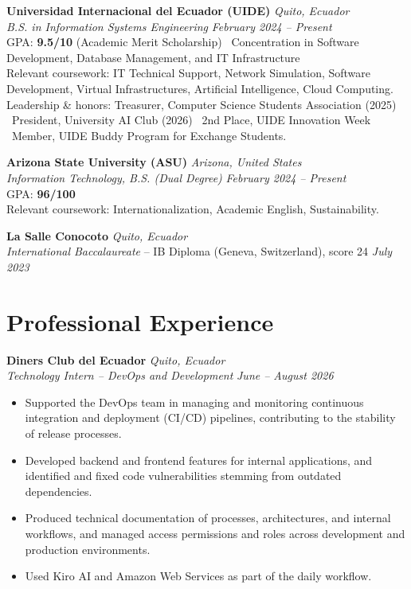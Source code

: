 \documentclass[10.5pt]{article}
\begin{document}
\textbf{Universidad Internacional del Ecuador (UIDE)} \hfill \textit{Quito, Ecuador}\\
\textit{B.S. in Information Systems Engineering} \hfill \textit{February 2024 -- Present}\\
GPA: \textbf{9.5/10} (Academic Merit Scholarship) \textbullet\ Concentration in Software Development, Database Management, and IT Infrastructure\\
Relevant coursework: IT Technical Support, Network Simulation, Software Development, Virtual Infrastructures, Artificial Intelligence, Cloud Computing.\\
Leadership \& honors: Treasurer, Computer Science Students Association (2025) \textbullet\ President, University AI Club (2026) \textbullet\ 2nd Place, UIDE Innovation Week \textbullet\ Member, UIDE Buddy Program for Exchange Students.

\vspace{0.3em}
\textbf{Arizona State University (ASU)} \hfill \textit{Arizona, United States}\\
\textit{Information Technology, B.S. (Dual Degree)} \hfill \textit{February 2024 -- Present}\\
GPA: \textbf{96/100}\\
Relevant coursework: Internationalization, Academic English, Sustainability.

\vspace{0.3em}
\textbf{La Salle Conocoto} \hfill \textit{Quito, Ecuador}\\
\textit{International Baccalaureate} -- IB Diploma (Geneva, Switzerland), score 24 \hfill \textit{July 2023}

\section*{Professional Experience}

\textbf{Diners Club del Ecuador} \hfill \textit{Quito, Ecuador}\\
\textit{Technology Intern -- DevOps and Development} \hfill \textit{June -- August 2026}
\begin{itemize}
    \item Supported the DevOps team in managing and monitoring continuous integration and deployment (CI/CD) pipelines, contributing to the stability of release processes.
    \item Developed backend and frontend features for internal applications, and identified and fixed code vulnerabilities stemming from outdated dependencies.
    \item Produced technical documentation of processes, architectures, and internal workflows, and managed access permissions and roles across development and production environments.
    \item Used Kiro AI and Amazon Web Services as part of the daily workflow.
\end{itemize}
\end{document}
